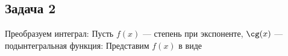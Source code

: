 \def \picdir{pic/}

\subsection*{Задача 2}
Преобразуем интеграл:
Пусть $f(x)$ --- степень при экспоненте, $\cg(x)$ --- подынтегральная функция:
Представим $f(x)$ в виде
